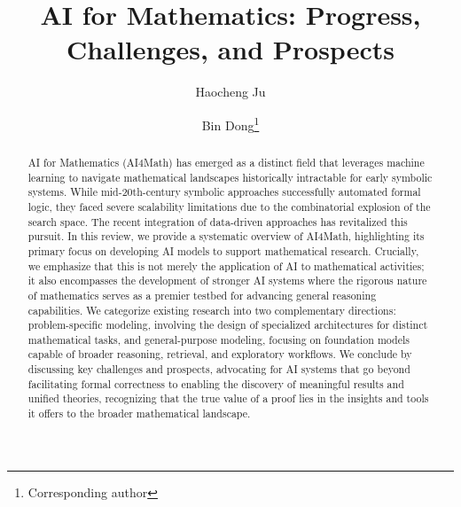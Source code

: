 \documentclass[11pt]{article}
\numberwithin{equation}{section}
\begin{document}
\title{AI for Mathematics: Progress, Challenges, and Prospects}





\author[1]{Haocheng Ju}
\author[2,3,4,5]{Bin Dong\thanks{Corresponding author}}


\maketitle



 {\begin{center}
\parbox{14.5cm}{\begin{abstract}
AI for Mathematics (AI4Math) has emerged as a distinct field that leverages machine learning to navigate mathematical landscapes historically intractable for early symbolic systems. While mid-20th-century symbolic approaches successfully automated formal logic, they faced severe scalability limitations due to the combinatorial explosion of the search space. The recent integration of data-driven approaches has revitalized this pursuit. In this review, we provide a systematic overview of AI4Math, highlighting its primary focus on developing AI models to support mathematical research. Crucially, we emphasize that this is not merely the application of AI to mathematical activities; it also encompasses the development of stronger AI systems where the rigorous nature of mathematics serves as a premier testbed for advancing general reasoning capabilities. We categorize existing research into two complementary directions: problem-specific modeling, involving the design of specialized architectures for distinct mathematical tasks, and general-purpose modeling, focusing on foundation models capable of broader reasoning, retrieval, and exploratory workflows. We conclude by discussing key challenges and prospects, advocating for AI systems that go beyond facilitating formal correctness to enabling the discovery of meaningful results and unified theories, recognizing that the true value of a proof lies in the insights and tools it offers to the broader mathematical landscape.

 
 
\end{abstract}}\end{center}}
\end{document}
